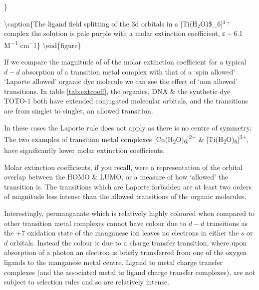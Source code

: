 \documentclass[
]{book}
\begin{document}
\}

\textbackslash caption\{The ligand field splitting of the 3d orbitals in a {[}Ti(H\(_2\)O)\$\_6{]}\(^{3+}\) complex the solution is pale purple with a molar extinction coefficient, ε \textasciitilde{} 6.1 M\textsuperscript{−1} cm\(^{−}1\)\}\label{fig:Tisplitting}
\textbackslash end\{figure\}

If we compare the magnitude of of the molar extinction coefficient for a typical \(d-d\) absorption of a transition metal complex with that of a `spin allowed' `Laporte allowed' organic dye molecule we can see the effect of `non allowed' transitions. In table \ref{tab:extcoeff}, the organics, DNA \& the synthetic dye TOTO-1 both have extended conjugated molecular orbitals, and the transitions are from singlet to singlet, an allowed transition.

In these cases the Laporte rule does not apply as there is no centre of symmetry. The two examples of transition metal complexes {[}Cu(H\textsubscript{2}O)\textsubscript{6}{]}\textsuperscript{2+} \& {[}Ti(H\textsubscript{2}O)\textsubscript{6}{]}\textsuperscript{3+}, have significantly lower molar extinction coefficients.

Molar extinction coefficients, if you recall, were a representation of the orbital overlap between the HOMO \& LUMO, or a measure of how `allowed' the transition is. The transitions which are Laporte forbidden are at least two orders of magnitude less intense than the allowed transitions of the organic molecules.

Interestingly, permanganate which is relatively highly coloured when compared to other transition metal complexes cannot have colour due to \(d-d\) transitions as the +7 oxidation state of the manganese ion leaves no electrons in either the \(s\) or \(d\) orbitals. Instead the colour is due to a charge transfer transition, where upon absorption of a photon an electron is briefly transferred from one of the oxygen ligands to the manganese metal centre. Ligand to metal charge transfer complexes (and the associated metal to ligand charge transfer complexes), are not subject to selection rules and so are relatively intense.
\end{document}
